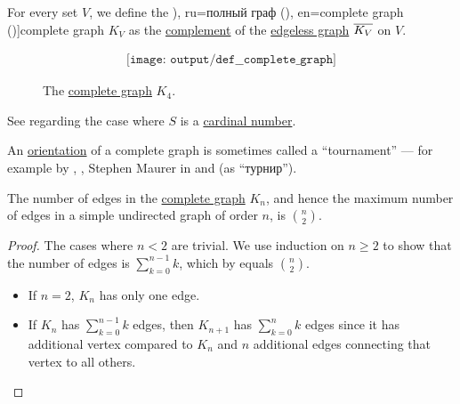 \begin{definition}\label{def:complete_graph}\mimprovised
  For every set \( V \), we define the \term[bg=пълен граф (\cite[12]{Мирчев2001}), ru=полный граф (\cite[10]{Емеличев1990}), en=complete graph (\cite[def. 1.3.1]{Knauer2011})]{complete graph} \( K_V \) as the \hyperref[def:graph_complement]{complement} of the \hyperref[def:edgeless_graph]{edgeless graph} \( \oline{K_V} \) on \( V \).

  \begin{figure}[!ht]
    \begin{equation}\label{eq:fig:def:complete_graph/k4}
      \begin{aligned}
        \texttt{[image: output/def\_\_complete\_graph]}
      \end{aligned}
    \end{equation}
    \caption{The \hyperref[def:complete_graph]{complete graph} \( K_4 \).}\label{fig:def:complete_graph/k4}
  \end{figure}
\end{definition}
\begin{comments}
  \item See  regarding the case where \( S \) is a \hyperref[def:cardinal]{cardinal number}.

  \item An \hyperref[def:multigraph_orientation]{orientation} of a complete graph is sometimes called a \enquote{tournament} --- for example by , , Stephen Maurer in \cite[570]{Rosen1999} and  (as \enquote{турнир}).
\end{comments}

\begin{proposition}\label{thm:complete_graph_edge_count}
  The number of edges in the \hyperref[def:complete_graph]{complete graph} \( K_n \), and hence the maximum number of edges in a simple undirected graph of order \( n \), is \( \binom n 2 \).
\end{proposition}
\begin{proof}
  The cases where \( n < 2 \) are trivial. We use induction on \( n \geq 2 \) to show that the number of edges is \( \sum_{k=0}^{n-1} k \), which by  equals \( \binom n 2 \).

  \begin{itemize}
    \item If \( n = 2 \), \( K_n \) has only one edge.
    \item If \( K_n \) has \( \sum_{k=0}^{n-1} k \) edges, then \( K_{n+1} \) has \( \sum_{k=0}^n k \) edges since it has additional vertex compared to \( K_n \) and \( n \) additional edges connecting that vertex to all others.
  \end{itemize}
\end{proof}

